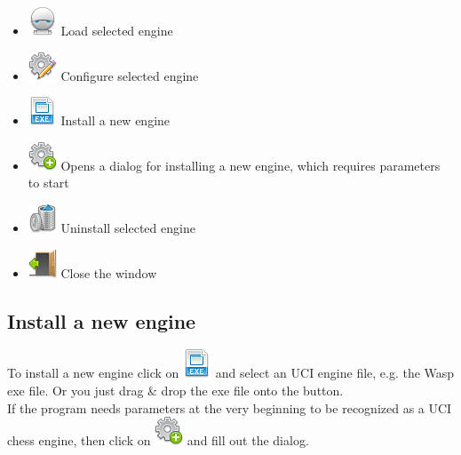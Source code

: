 \documentclass[11pt,a4paper]{article}
\begin{document}
\begin{itemize}
	\item \includegraphics[scale=0.5]{robot.png} Load selected engine
	\item \includegraphics[scale=0.5]{cog_edit.png} Configure selected engine
	\item \includegraphics[scale=0.5]{file_extension_exe.png} Install a new engine
    \item \includegraphics[scale=0.5]{cog_add.png} Opens a dialog for installing a new engine, which requires parameters to start
	\item \includegraphics[scale=0.5]{bin.png} Uninstall selected engine
	\item \includegraphics[scale=0.5]{door_out.png} Close the window
\end{itemize}

\subsection{Install a new engine} \label{InstallEngine}

To install a new engine click on \includegraphics[scale=0.5]{file_extension_exe.png} and select an UCI engine file, e.g. the Wasp exe file. Or you just drag \& drop the exe file onto the button.\\
If the program needs parameters at the very beginning to be recognized as a UCI chess engine, then click on \includegraphics[scale=0.5]{cog_add.png} and fill out the dialog.\\
\end{document}
